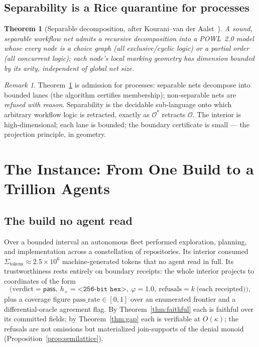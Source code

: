 \documentclass[11pt,oneside]{book}
\theoremstyle{definition}
\theoremstyle{plain}
\newtheorem{theorem}{Theorem}[chapter]
\theoremstyle{remark}
\newtheorem*{remark}{Remark}
\newcommand{\Obs}{\mathcal{O}}                 %
\newcommand{\Adm}{\mathcal{O}^{*}}             %
\newcommand{\CL}{\kappa}                       %
\newcommand{\Fitness}{\varphi}
\begin{document}
\section{Separability is a Rice quarantine for processes}

\begin{theorem}[Separable decomposition, after Kourani--van der Aalst~\cite{kourani2026,vanderaalst2016}]\label{thm:sep}
A sound, separable workflow net admits a recursive decomposition into a POWL~2.0 model whose
every node is a choice graph (all exclusive/cyclic logic) or a partial order (all concurrent
logic); each node's local marking geometry has dimension bounded by its arity, independent of
global net size.
\end{theorem}

\begin{remark}
Theorem~\ref{thm:sep} is admission for processes: separable nets decompose into bounded lanes
(the algorithm certifies membership); non-separable nets are \emph{refused with reason}.
Separability is the decidable sub-language onto which arbitrary workflow logic is retracted,
exactly as $\Adm$ retracts $\Obs$. The interior is high-dimensional; each lane is bounded; the
boundary certificate is small --- the projection principle, in geometry.
\end{remark}

\chapter{The Instance: From One Build to a Trillion Agents}
\label{ch:instance}

\section{The build no agent read}

Over a bounded interval an autonomous fleet performed exploration, planning, and
implementation across a constellation of repositories. Its interior consumed
$\Sigma_{\text{tokens}}\approx 2.5\times 10^{6}$ machine-generated tokens that no agent read
in full. Its trustworthiness rests entirely on boundary receipts: the whole interior projects
to coordinates of the form
\[
\bigl(\text{verdict}=\textsf{pass},\ h_+=\texttt{<256-bit hex>},\ \Fitness=1.0,\ \text{refusals}=k\ \text{(each receipted)}\bigr),
\]
plus a coverage figure $\text{pass\_rate}\in[0,1]$ over an enumerated frontier and a
differential-oracle agreement flag. By Theorem~\ref{thm:faithful} each is faithful over its
committed fields; by Theorem~\ref{thm:gap} each is verifiable at $O(\CL)$; the refusals are not
omissions but materialized join-supports of the denial monoid (Proposition~\ref{prop:semilattice}).
\end{document}
